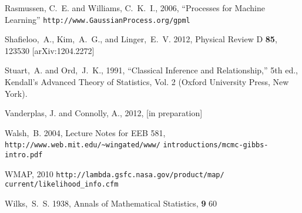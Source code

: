 \documentclass[useAMS,usenatbib]{aastex}
\begin{document}
\begin{thebibliography}{99}
Rasmussen, C.~E. and Williams, C.~K.~I., 2006, ``Processes for Machine Learning''
\verb|http://www.GaussianProcess.org/gpml|

Shafieloo,~A., Kim,~A.~G., and Linger,~E.~V. 2012,
Physical Review D {\bf 85}, 123530 [arXiv:1204.2272]

Stuart,~A. and Ord,~J.~K., 1991, ``Classical Inference and Relationship,''
5th ed., Kendall's Advanced Theory of Statistics, Vol. 2
(Oxford University Press, New York).

Vanderplas, J. and Connolly, A., 2012, [in preparation]

Walsh,~B. 2004, Lecture Notes for EEB 581,
\verb|http://www.web.mit.edu/~wingated/www/|
\verb|introductions/mcmc-gibbs-intro.pdf|

WMAP, 2010
\verb|http://lambda.gsfc.nasa.gov/product/map/|
\verb|current/likelihood_info.cfm|

Wilks,~S.~S. 1938, Annals of Mathematical Statistics, {\bf 9} 60

\end{thebibliography} 

\label{lastpage}
\end{document}
